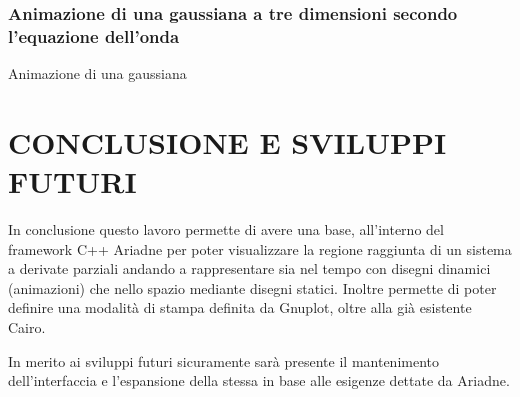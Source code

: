\documentclass{article}
\begin{document}
\subsubsection{Animazione di una gaussiana a tre dimensioni secondo l'equazione dell'onda}

\begin{frame}{Animazione di una gaussiana}
\end{frame}

\section{CONCLUSIONE E SVILUPPI FUTURI}
In conclusione questo lavoro permette di avere una base, all'interno del framework C++ Ariadne per poter visualizzare la regione raggiunta di un sistema a derivate parziali andando a rappresentare sia nel tempo con disegni dinamici (animazioni) che nello spazio mediante disegni statici. Inoltre permette di poter definire una modalità di stampa definita da Gnuplot, oltre alla già esistente Cairo.

In merito ai sviluppi futuri sicuramente sarà presente il mantenimento dell'interfaccia e l'espansione della stessa in base alle esigenze dettate da Ariadne.
\end{document}

